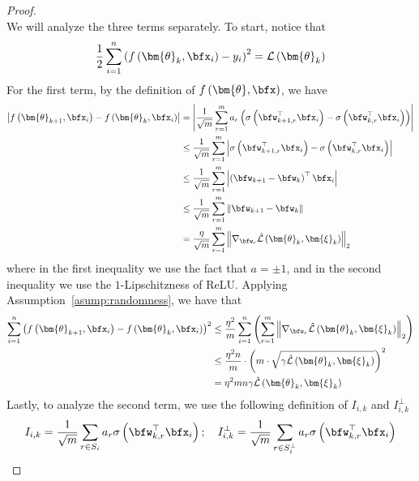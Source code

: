 \documentclass[10pt]{article} %
\theoremstyle{definition}
\theoremstyle{plain}
\newcommand{\paren}[1]{\left(#1\right)}
\newcommand{\norm}[1]{\left\|#1\right\|}
\def\calL{{\mathcal{L}}}
\begin{document}
\begin{proof}
\begin{equation}
    \end{equation}
    We will analyze the three terms separately. To start, notice that
    \begin{equation}
        \label{eq:thm_conv_proof_2}
        \frac{1}{2}\sum_{i=1}^n\paren{f\paren{\bm{\theta}_k,\bfx_i} - y_i}^2 = \calL\paren{\bm{\theta}_k}
    \end{equation}
    For the first term, by the definition of $f\paren{\bm{\theta},\bfx}$, we have
    \begin{align*}
        \left|f\paren{\bm{\theta}_{k+1},\bfx_i} - f\paren{\bm{\theta}_{k},\bfx_i}\right| & = \left|\frac{1}{\sqrt{m}}\sum_{r=1}^ma_r\paren{\sigma\paren{\bfw_{k+1,r}^\top\bfx_i} - \sigma\paren{\bfw_{k,r}^\top\bfx_i}}\right|\\
        & \leq \frac{1}{\sqrt{m}}\sum_{r=1}^m\left|\sigma\paren{\bfw_{k+1,r}^\top\bfx_i} - \sigma\paren{\bfw_{k,r}^\top\bfx_i}\right|\\
        & \leq \frac{1}{\sqrt{m}}\sum_{r=1}^m\left|\paren{\bfw_{k+1}-\bfw_k}^\top\bfx_i\right|\\
        & \leq \frac{1}{\sqrt{m}}\sum_{r=1}^m\norm{\bfw_{k+1}-\bfw_k}\\
        & = \frac{\eta}{\sqrt{m}}\sum_{r=1}^m\norm{\nabla_{\bfw_r}\hat{\calL}\paren{\bm{\theta}_k,\bm{\xi}_k}}_2
    \end{align*}
    where in the first inequality we use the fact that $a = \pm 1$, and in the second inequality we use the $1$-Lipschitzness of ReLU. Applying Assumption~\ref{asump:randomness}, we have that
    \begin{equation}
        \label{eq:thm_conv_proof_3}
        \begin{aligned}
            \sum_{i=1}^n\paren{f\paren{\bm{\theta}_{k+1},\bfx_i} - f\paren{\bm{\theta}_{k},\bfx_i}}^2 & \leq \frac{\eta^2}{m}\sum_{i=1}^n\paren{\sum_{r=1}^m\norm{\nabla_{\bfw_r}\hat{\calL}\paren{\bm{\theta}_k,\bm{\xi}_k}}_2}\\
            & \leq \frac{\eta^2n}{m}\cdot \paren{m\cdot \sqrt{\gamma\hat{\calL}\paren{\bm{\theta}_k,\bm{\xi}_k}}}^2\\
            & = \eta^2 mn\gamma\hat{\calL}\paren{\bm{\theta}_k,\bm{\xi}_k}
        \end{aligned}
    \end{equation}
    Lastly, to analyze the second term, we use the following definition of $I_{i,k}$ and $I_{i,k}^\perp$
    \begin{align*}
        I_{i,k} = \frac{1}{\sqrt{m}}\sum_{r\in S_i}a_r\sigma\paren{\bfw_{k,r}^\top\bfx_i};\quad I_{i,k}^\perp = \frac{1}{\sqrt{m}}\sum_{r\in S_i^\perp}a_r\sigma\paren{\bfw_{k,r}^\top\bfx_i}

\end{align*}
\end{proof}
\end{document}
